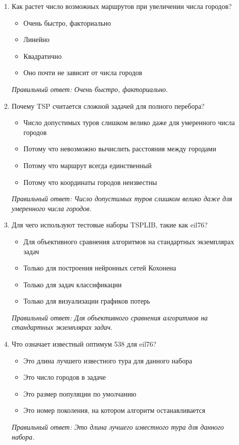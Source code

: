 \begin{enumerate}[label=\textbf{\arabic*.}, leftmargin=0pt, itemsep=1.2em]
\item Как растет число возможных маршрутов при увеличении числа городов?
\begin{itemize}[label=$\square$, leftmargin=1.5cm, itemsep=0.2em, topsep=0.3em]
\item Очень быстро, факториально
\item Линейно
\item Квадратично
\item Оно почти не зависит от числа городов
\end{itemize}
{\small\textit{Правильный ответ: Очень быстро, факториально.}}

\item Почему TSP считается сложной задачей для полного перебора?
\begin{itemize}[label=$\square$, leftmargin=1.5cm, itemsep=0.2em, topsep=0.3em]
\item Число допустимых туров слишком велико даже для умеренного числа городов
\item Потому что невозможно вычислить расстояния между городами
\item Потому что маршрут всегда единственный
\item Потому что координаты городов неизвестны
\end{itemize}
{\small\textit{Правильный ответ: Число допустимых туров слишком велико даже для умеренного числа городов.}}

\item Для чего используют тестовые наборы TSPLIB, такие как eil76?
\begin{itemize}[label=$\square$, leftmargin=1.5cm, itemsep=0.2em, topsep=0.3em]
\item Для объективного сравнения алгоритмов на стандартных экземплярах задач
\item Только для построения нейронных сетей Кохонена
\item Только для задач классификации
\item Только для визуализации графиков потерь
\end{itemize}
{\small\textit{Правильный ответ: Для объективного сравнения алгоритмов на стандартных экземплярах задач.}}

\item Что означает известный оптимум 538 для eil76?
\begin{itemize}[label=$\square$, leftmargin=1.5cm, itemsep=0.2em, topsep=0.3em]
\item Это длина лучшего известного тура для данного набора
\item Это число городов в задаче
\item Это размер популяции по умолчанию
\item Это номер поколения, на котором алгоритм останавливается
\end{itemize}
{\small\textit{Правильный ответ: Это длина лучшего известного тура для данного набора.}}


\end{enumerate}
